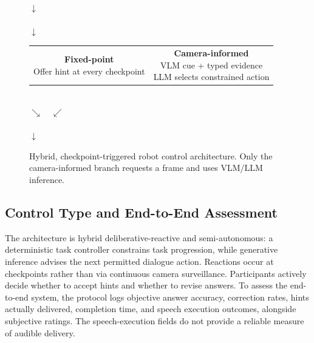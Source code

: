 \documentclass[conference]{IEEEtran}
\begin{document}
\begin{figure}[t]
\centering\footnotesize
{}\\[3pt]
$\downarrow$\\[2pt]
\\[3pt]
$\downarrow$\\[2pt]
\begin{tabular}{@{}cc@{}}
\fbox{\parbox{.40\columnwidth}{\centering\textbf{Fixed-point}\\Offer hint at every checkpoint}} &
\fbox{\parbox{.40\columnwidth}{\centering\textbf{Camera-informed}\\VLM cue + typed evidence\\LLM selects constrained action}}
\end{tabular}\\[3pt]
$\searrow\quad\swarrow$\\[2pt]
\\[3pt]
$\downarrow$\\[2pt]
\caption{Hybrid, checkpoint-triggered robot control architecture. Only the camera-informed branch requests a frame and uses VLM/LLM inference.}
\label{fig:architecture}
\end{figure}

\subsection{Control Type and End-to-End Assessment}
The architecture is hybrid deliberative-reactive and semi-autonomous: a deterministic task controller constrains task progression, while generative inference advises the next permitted dialogue action. Reactions occur at checkpoints rather than via continuous camera surveillance. Participants actively decide whether to accept hints and whether to revise answers. To assess the end-to-end system, the protocol logs objective answer accuracy, correction rates, hints actually delivered, completion time, and speech execution outcomes, alongside subjective ratings. The speech-execution fields do not provide a reliable measure of audible delivery.
\end{document}
